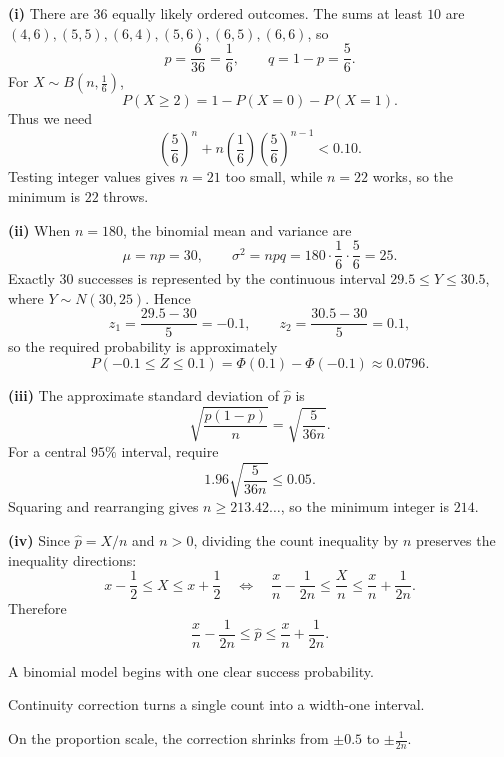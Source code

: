 \begin{solution}
\textbf{(i)} There are $36$ equally likely ordered outcomes. The sums at least $10$ are
$(4,6),(5,5),(6,4),(5,6),(6,5),(6,6)$, so
\[
p=\frac{6}{36}=\frac16,\qquad q=1-p=\frac56.
\]
For $X\sim B(n,\frac16)$,
\[
P(X\ge2)=1-P(X=0)-P(X=1).
\]
Thus we need
\[
\left(\frac56\right)^n+n\left(\frac16\right)\left(\frac56\right)^{n-1}<0{.}10.
\]
Testing integer values gives $n=21$ too small, while $n=22$ works, so the minimum is $\boxed{22}$ throws.

\textbf{(ii)} When $n=180$, the binomial mean and variance are
\[
\mu=np=30,\qquad \sigma^2=npq=180\cdot\frac16\cdot\frac56=25.
\]
Exactly $30$ successes is represented by the continuous interval $29{.}5\le Y\le30{.}5$, where $Y\sim N(30,25)$. Hence
\[
z_1=\frac{29{.}5-30}{5}=-0{.}1,\qquad
z_2=\frac{30{.}5-30}{5}=0{.}1,
\]
so the required probability is approximately
\[
P(-0{.}1\le Z\le0{.}1)=\Phi(0{.}1)-\Phi(-0{.}1)\approx \boxed{0{.}0796}.
\]

\textbf{(iii)} The approximate standard deviation of $\hat p$ is
\[
\sqrt{\frac{p(1-p)}{n}}=\sqrt{\frac{5}{36n}}.
\]
For a central $95\%$ interval, require
\[
1{.}96\sqrt{\frac{5}{36n}}\le0{.}05.
\]
Squaring and rearranging gives $n\ge213{.}42\ldots$, so the minimum integer is $\boxed{214}$.

\textbf{(iv)} Since $\hat p=X/n$ and $n>0$, dividing the count inequality by $n$ preserves the inequality directions:
\[
x-\frac12\le X\le x+\frac12
\quad\Longleftrightarrow\quad
\frac{x}{n}-\frac{1}{2n}\le \frac{X}{n}\le \frac{x}{n}+\frac{1}{2n}.
\]
Therefore
\[
\frac{x}{n}-\frac{1}{2n}\le \hat p\le \frac{x}{n}+\frac{1}{2n}.
\]
\end{solution}

\begin{takeaways}
\item A binomial model begins with one clear success probability.
\item Continuity correction turns a single count into a width-one interval.
\item On the proportion scale, the correction shrinks from $\pm0{.}5$ to $\pm\frac{1}{2n}$.
\end{takeaways}

